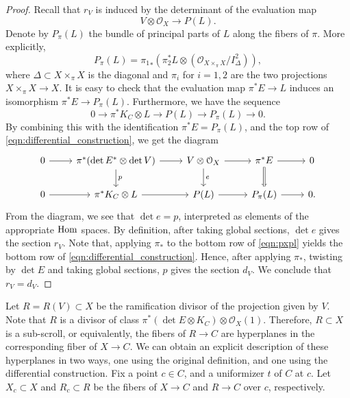 \documentclass[11pt,reqno]{amsart}
\theoremstyle{plain}
\theoremstyle{definition}
\theoremstyle{remark}
\numberwithin{equation}{section}
\renewcommand{\to}{{\longrightarrow}}
\numberwithin{equation}{section}
\renewcommand{\O}{\mathcal O}
\begin{document}
\begin{proof}
  Recall that $r_V$ is induced by the determinant of the evaluation map
  \[ V \otimes \O_X \to P(L).\]
  Denote by $P_\pi(L)$ the bundle of principal parts of $L$ along the fibers of $\pi$.
  More explicitly,
  \[ P_\pi(L) = {\pi_1}_* \left(\pi_2^* L \otimes \left(\O_{X \times_\pi X} / I_{\Delta}^2\right)\right),\]
  where $\Delta \subset X \times_\pi X$ is the diagonal and $\pi_i$ for $i = 1,2$ are the two projections $X \times_\pi X \to X$.
  It is easy to check that the evaluation map $\pi^* E \to L$ induces an isomorphism $\pi^* E \to P_\pi(L)$.
  Furthermore, we have the sequence
  \[ 0 \to \pi^* K_C \otimes L \to P(L) \to P_\pi(L) \to 0.\]
  By combining this with the identification $\pi^* E = P_\pi(L)$, and the top row of \eqref{eqn:differential_construction}, we get the diagram
  \begin{equation}\label{eqn:pxpl}
    \begin{tikzcd}
      0 \arrow{r}& \pi^*(\det E^* \otimes \det V) \arrow{r}\arrow{d}{p}& V \otimes \O_X \arrow{r}\arrow{d}{e}& \pi^* E \arrow{r}\arrow{d}\arrow[equal]{d}& 0\\
      0 \arrow{r}& \pi^* K_C \otimes L \arrow{r}& P(L) \arrow{r}& P_\pi(L) \arrow{r}& 0.
    \end{tikzcd}
  \end{equation}
  From the diagram, we see that $\det e = p$, interpreted as elements of the appropriate $\operatorname{Hom}$ spaces.
  By definition, after taking global sections, $\det e$ gives the section $r_V$.
  Note that, applying $\pi_*$ to the bottom row of \eqref{eqn:pxpl} yields the bottom row of \eqref{eqn:differential_construction}.
  Hence, after applying $\pi_*$, twisting by $\det E$ and taking global sections, $p$ gives the section $d_V$.
  We conclude that $r_V = d_V$.
\end{proof}

Let $R = R(V) \subset X$ be the ramification divisor of the projection given by $V$.
Note that $R$ is a divisor of class $\pi^*(\det E \otimes K_C) \otimes \O_X(1)$.
Therefore, $R \subset X$ is a sub-scroll, or equivalently, the fibers of $R \to C$ are hyperplanes in the corresponding fiber of $X \to C$.
We can obtain an explicit description of these hyperplanes in two ways, one using the original definition, and one using the differential construction.
Fix a point $c \in C$, and a uniformizer $t$ of $C$ at $c$.
Let $X_c \subset X$ and $R_c \subset R$ be the fibers of $X \to C$ and $R \to C$ over $c$, respectively.
\end{document}
